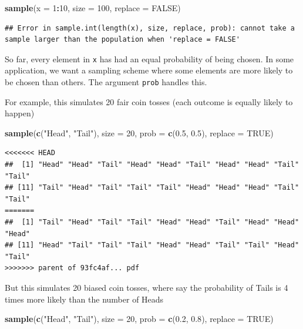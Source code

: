 \documentclass[]{book}
\newenvironment{Shaded}{\begin{snugshade}}{\end{snugshade}}
\newcommand{\DataTypeTok}[1]{\textcolor[rgb]{0.13,0.29,0.53}{#1}}
\newcommand{\DecValTok}[1]{\textcolor[rgb]{0.00,0.00,0.81}{#1}}
\newcommand{\FloatTok}[1]{\textcolor[rgb]{0.00,0.00,0.81}{#1}}
\newcommand{\KeywordTok}[1]{\textcolor[rgb]{0.13,0.29,0.53}{\textbf{#1}}}
\newcommand{\NormalTok}[1]{#1}
\newcommand{\OperatorTok}[1]{\textcolor[rgb]{0.81,0.36,0.00}{\textbf{#1}}}
\newcommand{\OtherTok}[1]{\textcolor[rgb]{0.56,0.35,0.01}{#1}}
\newcommand{\StringTok}[1]{\textcolor[rgb]{0.31,0.60,0.02}{#1}}
\theoremstyle{definition}
\theoremstyle{definition}
\theoremstyle{definition}
\theoremstyle{remark}
\begin{document}
\begin{Shaded}
\begin{Highlighting}[]
\begin{Shaded}
\begin{Highlighting}[]
\begin{Shaded}
\begin{Highlighting}[]
\begin{Shaded}
\begin{Highlighting}[]
\KeywordTok{sample}\NormalTok{(}\DataTypeTok{x =} \DecValTok{1}\OperatorTok{:}\DecValTok{10}\NormalTok{, }\DataTypeTok{size =} \DecValTok{100}\NormalTok{, }\DataTypeTok{replace =} \OtherTok{FALSE}\NormalTok{)}
\end{Highlighting}
\end{Shaded}

\begin{verbatim}
## Error in sample.int(length(x), size, replace, prob): cannot take a sample larger than the population when 'replace = FALSE'
\end{verbatim}

So far, every element in \texttt{x} has had an equal probability of being chosen. In some application, we want a sampling scheme where some elements are more likely to be chosen than others. The argument \texttt{prob} handles this.

For example, this simulates 20 fair coin tosses (each outcome is equally likely to happen)

\begin{Shaded}
\begin{Highlighting}[]
\KeywordTok{sample}\NormalTok{(}\KeywordTok{c}\NormalTok{(}\StringTok{"Head"}\NormalTok{, }\StringTok{"Tail"}\NormalTok{), }\DataTypeTok{size =} \DecValTok{20}\NormalTok{, }\DataTypeTok{prob =} \KeywordTok{c}\NormalTok{(}\FloatTok{0.5}\NormalTok{, }\FloatTok{0.5}\NormalTok{), }\DataTypeTok{replace =} \OtherTok{TRUE}\NormalTok{)}
\end{Highlighting}
\end{Shaded}

\begin{verbatim}
<<<<<<< HEAD
##  [1] "Head" "Head" "Tail" "Head" "Head" "Tail" "Head" "Head" "Tail" "Tail"
## [11] "Tail" "Head" "Tail" "Tail" "Tail" "Head" "Head" "Head" "Tail" "Tail"
=======
##  [1] "Tail" "Head" "Tail" "Tail" "Head" "Head" "Tail" "Head" "Head" "Head"
## [11] "Head" "Tail" "Tail" "Tail" "Head" "Head" "Tail" "Tail" "Head" "Tail"
>>>>>>> parent of 93fc4af... pdf
\end{verbatim}

But this simulates 20 biased coin tosses, where say the probability of Tails is 4 times more likely than the number of Heads

\begin{Shaded}
\begin{Highlighting}[]
\KeywordTok{sample}\NormalTok{(}\KeywordTok{c}\NormalTok{(}\StringTok{"Head"}\NormalTok{, }\StringTok{"Tail"}\NormalTok{), }\DataTypeTok{size =} \DecValTok{20}\NormalTok{, }\DataTypeTok{prob =} \KeywordTok{c}\NormalTok{(}\FloatTok{0.2}\NormalTok{, }\FloatTok{0.8}\NormalTok{), }\DataTypeTok{replace =} \OtherTok{TRUE}\NormalTok{)}
\end{Highlighting}
\end{Shaded}


\end{Highlighting}
\end{Shaded}
\end{Highlighting}
\end{Shaded}
\end{Highlighting}
\end{Shaded}
\end{document}
